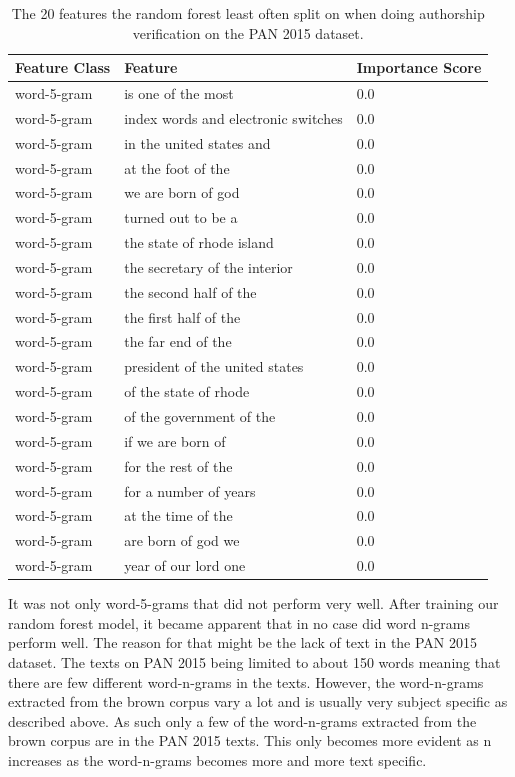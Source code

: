 \begin{table}
    \centering
    \begin{tabular}{lll}
        \textbf{Feature Class} & \textbf{Feature} & \textbf{Importance Score} \\
        \hline
        word-5-gram & is one of the most & 0.0 \\
        word-5-gram & index words and electronic switches & 0.0 \\
        word-5-gram & in the united states and & 0.0 \\
        word-5-gram & at the foot of the & 0.0 \\
        word-5-gram & we are born of god & 0.0 \\
        word-5-gram & turned out to be a & 0.0 \\
        word-5-gram & the state of rhode island & 0.0 \\
        word-5-gram & the secretary of the interior & 0.0 \\
        word-5-gram & the second half of the & 0.0 \\
        word-5-gram & the first half of the & 0.0 \\
        word-5-gram & the far end of the & 0.0 \\
        word-5-gram & president of the united states & 0.0 \\
        word-5-gram & of the state of rhode & 0.0 \\
        word-5-gram & of the government of the & 0.0 \\
        word-5-gram & if we are born of & 0.0 \\
        word-5-gram & for the rest of the & 0.0 \\
        word-5-gram & for a number of years & 0.0 \\
        word-5-gram & at the time of the & 0.0 \\
        word-5-gram & are born of god we & 0.0 \\
        word-5-gram & year of our lord one & 0.0
    \end{tabular}
    \caption{The 20 features the random forest least often split on when doing
    authorship verification on the PAN 2015 dataset.}
    \label{tab:feature_non_importance}
\end{table}

It was not only word-5-grams that did not perform very well. After training
our random forest model, it became apparent that in no case did word
n-grams perform well. The reason for that might be the lack of text in the PAN
2015 dataset. The texts on PAN 2015 being limited to about 150 words meaning
that there are few different word-n-grams in the texts. However, the
word-n-grams extracted from the brown corpus vary a lot and is usually very
subject specific as described above. As such only a few of the word-n-grams
extracted from the brown corpus are in the PAN 2015 texts. This only becomes
more evident as n increases as the word-n-grams becomes more and more text
specific.

